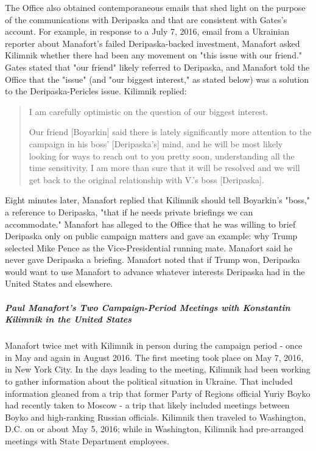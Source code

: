 The Office also obtained contemporaneous emails that shed light on the purpose of the communications with Deripaska and that are consistent with Gates's account.
For example, in response to a July 7, 2016, email from a Ukrainian reporter about Manafort's failed Deripaska-backed investment, Manafort asked Kilimnik whether there had been any movement on "this issue with our friend."%
Gates stated that "our friend" likely referred to Deripaska,%
and Manafort told the Office that the "issue" (and "our biggest interest," as stated below) was a solution to the Deripaska-Pericles issue.%
Kilimnik replied:

\begin{quote}
I am carefully optimistic on the question of our biggest interest.

Our friend [Boyarkin] said there is lately significantly more attention to the campaign in his boss' [Deripaska's] mind, and he will be most likely looking for ways to reach out to you pretty soon, understanding all the time sensitivity.
I am more than sure that it will be resolved and we will get back to the original relationship with V.'s boss [Deripaska].%
\end{quote}

Eight minutes later, Manafort replied that Kilimnik should tell Boyarkin's "boss," a reference to Deripaska, "that if he needs private briefings we can accommodate."%
Manafort has alleged to the Office that he was willing to brief Deripaska only on public campaign matters and gave an example: why Trump selected Mike Pence as the Vice-Presidential running mate.%
Manafort said he never gave Deripaska a briefing.%
Manafort noted that if Trump won, Deripaska would want to use Manafort to advance whatever interests Deripaska had in the United States and elsewhere.%

\subparagraph{Paul Manafort's Two Campaign-Period Meetings with Konstantin Kilimnik in the United States}

Manafort twice met with Kilimnik in person during the campaign period - once in May and again in August 2016.
The first meeting took place on May 7, 2016, in New York City.%
In the days leading to the meeting, Kilimnik had been working to gather information about the political situation in Ukraine.
That included information gleaned from a trip that former Party of Regions official Yuriy Boyko had recently taken to Moscow - a trip that likely included meetings between Boyko and high-ranking Russian officials.%
Kilimnik then traveled to Washington, D.C. on or about May 5, 2016; while in Washington, Kilimnik had pre-arranged meetings with State Department employees.%

